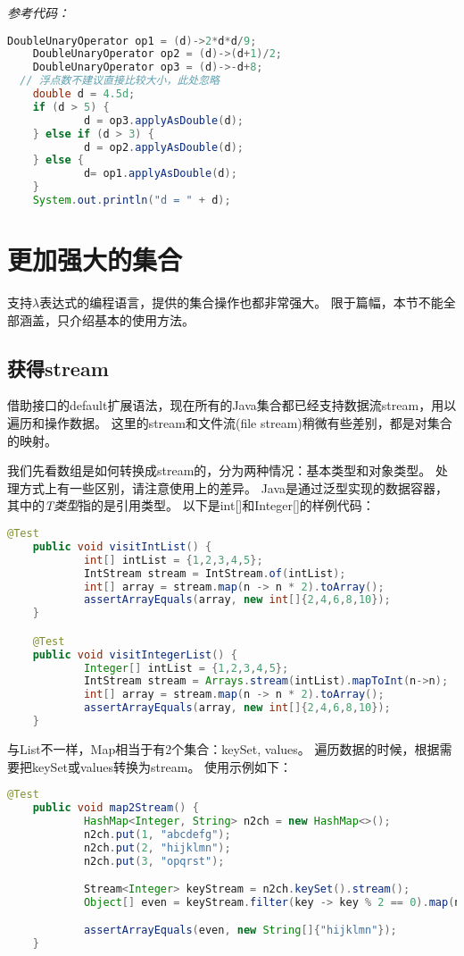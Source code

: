 \emph{参考代码：}
\begin{lstlisting}[language=java]
	DoubleUnaryOperator op1 = (d)->2*d*d/9;
	DoubleUnaryOperator op2 = (d)->(d+1)/2;
	DoubleUnaryOperator op3 = (d)->-d+8;
  // 浮点数不建议直接比较大小，此处忽略
	double d = 4.5d;
	if (d > 5) {
			d = op3.applyAsDouble(d);
	} else if (d > 3) {
			d = op2.applyAsDouble(d);
	} else {
			d= op1.applyAsDouble(d);
	}
	System.out.println("d = " + d);
\end{lstlisting}

\section{更加强大的集合}
支持$\lambda$表达式的编程语言，提供的集合操作也都非常强大。
限于篇幅，本节不能全部涵盖，只介绍基本的使用方法。

\subsection{获得stream}
借助接口的default扩展语法，现在所有的Java集合都已经支持数据流stream，用以遍历和操作数据。
这里的stream和文件流(file stream)稍微有些差别，都是对集合的映射。

我们先看数组是如何转换成stream的，分为两种情况：基本类型和对象类型。
处理方式上有一些区别，请注意使用上的差异。
Java是通过泛型实现的数据容器，其中的\emph{T类型}指的是引用类型。
\vspace{0.5cm}
\noindent
以下是int[]和Integer[]的样例代码：
\begin{lstlisting}[language=Java]
	@Test
	public void visitIntList() {
			int[] intList = {1,2,3,4,5};
			IntStream stream = IntStream.of(intList);
			int[] array = stream.map(n -> n * 2).toArray();
			assertArrayEquals(array, new int[]{2,4,6,8,10});
	}

	@Test
	public void visitIntegerList() {
			Integer[] intList = {1,2,3,4,5};
			IntStream stream = Arrays.stream(intList).mapToInt(n->n);
			int[] array = stream.map(n -> n * 2).toArray();
			assertArrayEquals(array, new int[]{2,4,6,8,10});
	}
\end{lstlisting}

与List不一样，Map相当于有2个集合：keySet, values。
遍历数据的时候，根据需要把keySet或values转换为stream。
使用示例如下：
\begin{lstlisting}[language=Java]
  @Test
	public void map2Stream() {
			HashMap<Integer, String> n2ch = new HashMap<>();
			n2ch.put(1, "abcdefg");
			n2ch.put(2, "hijklmn");
			n2ch.put(3, "opqrst");

			Stream<Integer> keyStream = n2ch.keySet().stream();
			Object[] even = keyStream.filter(key -> key % 2 == 0).map(n2ch::get).toArray();

			assertArrayEquals(even, new String[]{"hijklmn"});
	}
\end{lstlisting}

